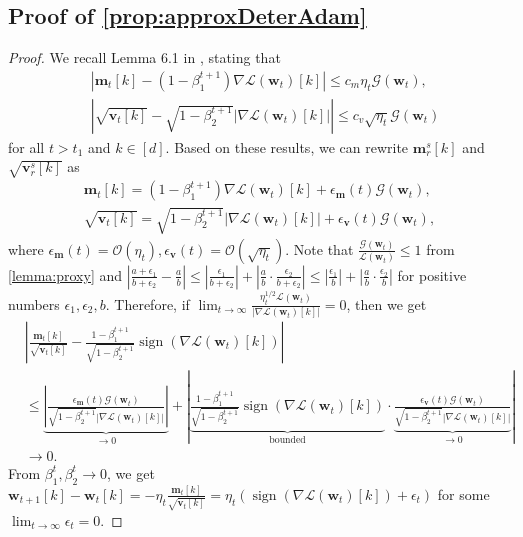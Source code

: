 \documentclass{article} %
\theoremstyle{plain}
\theoremstyle{definition}
\theoremstyle{remark}
\def\bigabs#1{\left|#1\right|}
\def\bigopen#1{\left(#1\right)}
\def\gG{{\mathcal{G}}}
\newcommand{\Ls}{\mathcal{L}}
\DeclareMathOperator{\sign}{sign}
\def\bm{{\mathbf m}}
\def\bw{{\mathbf w}}
\def\bv{{\mathbf v}}
\begin{document}
\subsection[Proof of Proposition \ref{prop:approxDeterAdam}]{Proof of \cref{prop:approxDeterAdam}}
\approxDeterAdam*
\begin{proof}
    We recall Lemma 6.1 in \citet{zhang2024the}, stating that
    \begin{align*}
        &\bigabs{\bm_t[k]-(1-\beta_1^{t+1})\nabla \Ls(\bw_t)[k]} \leq c_m\eta_t\gG(\bw_t), \\
        &\bigabs{\sqrt{\bv_t[k]} - \sqrt{1-\beta_2^{t+1}}\bigabs{\nabla \Ls(\bw_t)[k]}}\leq c_v\sqrt{\eta_t}\gG(\bw_t)
    \end{align*}
    for all $t>t_1$ and $k \in [d]$. Based on these results, we can rewrite $\bm_r^s[k]$ and $\sqrt{\bv_r^s[k]}$ as
    \begin{align*}
        \bm_t[k] = (1-\beta_1^{t+1})\nabla \Ls(\bw_t)[k] + \epsilon_\bm(t)\gG(\bw_t), \\
        \sqrt{\bv_t[k]} = \sqrt{1-\beta_2^{t+1}}\bigabs{\nabla \Ls(\bw_t)[k]} + \epsilon_\bv(t)\gG(\bw_t),
    \end{align*}
    where $\epsilon_\bm(t)=\mathcal{O}(\eta_t), \epsilon_\bv(t) =\mathcal{O}(\sqrt{\eta_t})$. Note that $\frac{\gG(\bw_t)}{\Ls(\bw_t)} \leq 1$ from \cref{lemma:proxy} and $\bigabs{\frac{a+\epsilon_1}{b+\epsilon_2}-\frac{a}{b}}\leq\bigabs{\frac{\epsilon_1}{b+\epsilon_2}}+\bigabs{\frac{a}{b}\cdot\frac{\epsilon_2}{b+\epsilon_2}} \leq \bigabs{\frac{\epsilon_1}{b}}+\bigabs{\frac{a}{b}\cdot\frac{\epsilon_2}{b}}$ for positive numbers $\epsilon_1, \epsilon_2, b$. Therefore, if $\lim_{t \rightarrow \infty}\frac{\eta_t^{1/2}\Ls(\bw_t)}{|\nabla\Ls(\bw_t)[k]|} = 0$, then we get
    \begin{align*}
        &\bigabs{\frac{\bm_t[k]}{\sqrt{\bv_t[k]}}-\frac{1-\beta_1^{t+1}}{\sqrt{1-\beta_2^{t+1}}} \sign\bigopen{\nabla\Ls(\bw_t)[k]}} \\
        &\leq \underbrace{\bigabs{\frac{\epsilon_\bm(t)\gG(\bw_t)}{\sqrt{1-\beta_2^{t+1}}\bigabs{\nabla \Ls(\bw_t)[k]}}}}_{\rightarrow 0} + \bigabs{\underbrace{\frac{1-\beta_1^{t+1}}{\sqrt{1-\beta_2^{t+1}}} \sign\bigopen{\nabla\Ls(\bw_t)[k]}}_{\text{bounded}} \cdot \underbrace{\frac{\epsilon_\bv(t)\gG(\bw_t)}{\sqrt{1-\beta_2^{t+1}}\bigabs{\nabla \Ls(\bw_t)[k]}}}_{\rightarrow 0}} \\
        & \rightarrow 0.
    \end{align*}
    From $\beta_1^t, \beta_2^t \rightarrow 0$, we get $\bw_{t+1}[k]-\bw_t[k] = -\eta_t\frac{\bm_t[k]}{\sqrt{\bv_t[k]}} = \eta_t \bigopen{\sign\bigopen{\nabla \Ls(\bw_t)[k]} + \epsilon_t}$ for some $\lim_{t\rightarrow\infty} \epsilon_t=0$.
\end{proof}
\end{document}
